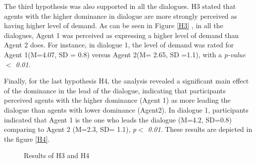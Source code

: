 \documentclass{llncs}
\begin{document}
				\par The third hypothesis was also supported in all the dialogues. H3 stated that agents with the higher dominance in dialogue are more strongly perceived as having higher level of demand. As can be seen in Figure \ref{H3} , in all the dialogues, Agent 1 was perceived as expressing a higher level of demand than Agent 2 does. For instance, in dialogue 1, the level of demand was rated for Agent 1(M=4.07, SD = 0.8) versus Agent 2(M= 2.65, SD =1.1), with a \textit{p-value $<$ 0.01}.
				
				\par Finally, for the last hypothesis H4, the analysis revealed a significant main effect of the dominance in the lead of the dialogue, indicating that participants perceived agents with the higher dominance (Agent 1) as more leading the dialogue than agents with lower dominance (Agent2). In dialogue 1, participants indicated that Agent 1 is the one who leads the dialogue (M=4.2, SD=0.8) comparing to Agent 2 (M=2.3, SD= 1.1), \textit{p$<$ 0.01}. These results are depicted in the figure \ref{H4}.
				
			\begin{figure}[htb!]
				\setlength\fboxsep{0pt}\setlength\fboxrule{0.75pt}
				{
					\caption{Results of H3 and H4}

				}
			\end{figure}%
\end{document}
